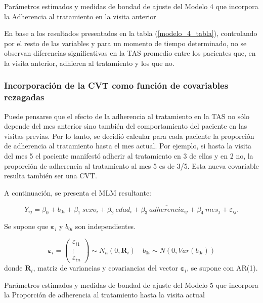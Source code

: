 \documentclass[spanish]{article}
\numberwithin{figure}{subsection}
\numberwithin{equation}{subsection}
\numberwithin{table}{subsection}
\begin{document}
\begin{table}[H]
	\centering
	\caption{Parámetros estimados y medidas de bondad de ajuste del Modelo 4 que incorpora la Adherencia al tratamiento en la visita anterior}
	\label{modelo_4_tabla}
	
\end{table}

En base a los resultados presentados en la tabla (\ref{modelo_4_tabla}),
controlando por el resto de las variables y para un momento de tiempo
determinado, no se observan diferencias significativas en la TAS promedio entre
los pacientes que, en la visita anterior, adhieren al tratamiento y los que no.

\subsubsection{Incorporación de la CVT como función de covariables rezagadas}

Puede pensarse que el efecto de la adherencia al tratamiento en la TAS no sólo
depende del mes anterior sino también del comportamiento del paciente en las
visitas previas. Por lo tanto, se decidió calcular para cada paciente la
proporción de adherencia al tratamiento hasta el mes actual. Por ejemplo, si
hasta la visita del mes 5 el paciente manifestó adherir al tratamiento en 3 de
ellas y en 2 no, la proporción de adherencia al tratamiento al mes 5 es de 3/5.
Esta nueva covariable resulta también ser una CVT.

A continuación, se presenta el MLM resultante:

\begin{equation}
	\label{modelo_5}
	Y_{ij} = \beta_0 + b_{0i} + \beta_1\ sexo_i + \beta_2\ edad_i + \beta_3\ \overline{adherencia}_{ij}
	+ \beta_4\ mes_j + \varepsilon_{ij}.
\end{equation}

Se supone que $\bm{\varepsilon}_i$ y $b_{0i}$ son independientes.

\[ 
	\bm{\varepsilon}_i = \begin{pmatrix} \varepsilon_{i1} \\ \vdots \\ \varepsilon_{in} \end{pmatrix} \sim N_{n}(0, \bm{R}_i)
	\quad
	b_{0i} \sim N(0, Var(b_{0i}))
\]
donde $\bm{R}_i$, matriz de variancias y covariancias del vector
$\bm{\varepsilon}_{i}$, se supone con AR(1).

\begin{table}[H]
	\centering
	\caption{Parámetros estimados y medidas de bondad de ajuste del Modelo 5 que incorpora la Proporción de adherencia al tratamiento hasta la visita actual}
	\label{modelo_5_tabla}
	
\end{table}
\end{document}
